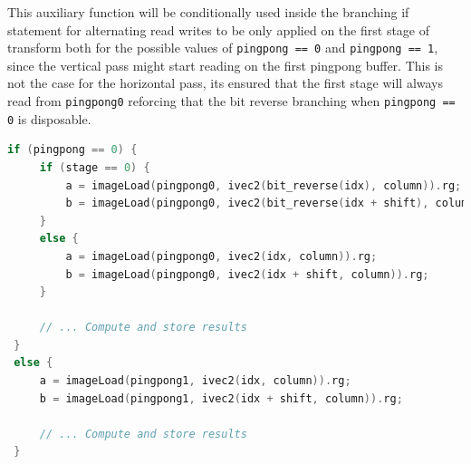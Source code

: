 \documentclass[
  oneside,
  11pt, a4paper,
  footinclude=true,
  headinclude=true,
  cleardoublepage=empty
]{scrbook}
\begin{document}
This auxiliary function will be conditionally used inside the branching if statement for alternating read writes to be only applied on the first stage of transform both for the possible values of \texttt{pingpong == 0} and \texttt{pingpong == 1}, since the vertical pass might start reading on the first pingpong buffer. This is not the case for the horizontal pass, its ensured that the first stage will always read from \texttt{pingpong0} reforcing that the bit reverse branching when \texttt{pingpong == 0} is disposable.

\begin{lstlisting}[language=C,label={Computation of the Cooley-Tukey butterfly with bit reversal}]
 if (pingpong == 0) {
     if (stage == 0) {
         a = imageLoad(pingpong0, ivec2(bit_reverse(idx), column)).rg;
         b = imageLoad(pingpong0, ivec2(bit_reverse(idx + shift), column)).rg;
     }
     else {
         a = imageLoad(pingpong0, ivec2(idx, column)).rg;
         b = imageLoad(pingpong0, ivec2(idx + shift, column)).rg;
     }

     // ... Compute and store results
 }
 else {
     a = imageLoad(pingpong1, ivec2(idx, column)).rg;
     b = imageLoad(pingpong1, ivec2(idx + shift, column)).rg;

     // ... Compute and store results
 }
\end{lstlisting}



\end{document}
